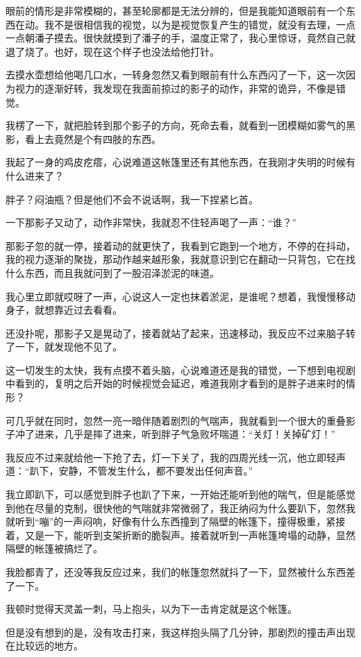 眼前的情形是非常模糊的，甚至轮廓都是无法分辨的，但是我能知道眼前有一个东西在动。我不是很相信我的视觉，以为是视觉恢复产生的错觉，就没有去理，一点一点朝潘子摸去。很快就摸到了潘子的手，温度正常了，我心里惊讶，竟然自己就退了烧了。也好，现在这个样子也没法给他打针。

去摸水壶想给他喝几口水，一转身忽然又看到眼前有什么东西闪了一下，这一次因为视力的逐渐好转，我发现在我面前掠过的影子的动作，非常的诡异，不像是错觉。

我楞了一下，就把脸转到那个影子的方向，死命去看，就看到一团模糊如雾气的黑影，看上去竟然是个有四肢的东西。

我起了一身的鸡皮疙瘩，心说难道这帐篷里还有其他东西，在我刚才失明的时候有什么进来了？

胖子？闷油瓶？但是他们不会不说话啊，我一下捏紧匕首。

一下那影子又动了，动作非常快，我就忍不住轻声喝了一声：“谁？”

那影子忽的就一停，接着动的就更快了，我看到它跑到一个地方，不停的在抖动，我的视力逐渐的聚拢，那动作越来越形象，我就意识到它在翻动一只背包，它在找什么东西，而且我就问到了一股沼泽淤泥的味道。

我心里立即就哎呀了一声，心说这人一定也抹着淤泥，是谁呢？想着，我慢慢移动身子，就想靠近过去看看。

还没扑呢，那影子又是晃动了，接着就站了起来，迅速移动，我反应不过来脑子转了一下，就发现他不见了。

这一切发生的太快，我有点摸不着头脑，心说难道还是我的错觉，一下想到电视剧中看到的，复明之后开始的时候视觉会延迟，难道我刚才看到的是胖子进来时的情形？

可几乎就在同时，忽然一亮一暗伴随着剧烈的气喘声，我就看到一个很大的重叠影子冲了进来，几乎是摔了进来，听到胖子气急败坏喘道：“关灯！关掉矿灯！”

我反应不过来就给他一下抢了去，灯一下关了，我的四周光线一沉，他立即轻声道：“趴下，安静，不管发生什么，都不要发出任何声音。”

我立即趴下，可以感觉到胖子也趴了下来，一开始还能听到他的喘气，但是能感觉到他在尽量的克制，很快他的气喘就非常微弱了，我正纳闷为什么要趴下，忽然我就听到“嘣”的一声闷响，好像有什么东西撞到了隔壁的帐篷下，撞得极重，紧接着，又是一下，能听到支架折断的脆裂声。接着就听到一声帐篷垮塌的动静，显然隔壁的帐篷被搞烂了。

我脸都青了，还没等我反应过来，我们的帐篷忽然就抖了一下，显然被什么东西差了一下。

我顿时觉得天灵盖一刺，马上抱头，以为下一击肯定就是这个帐篷。

但是没有想到的是，没有攻击打来，我这样抱头隔了几分钟，那剧烈的撞击声出现在比较远的地方。

